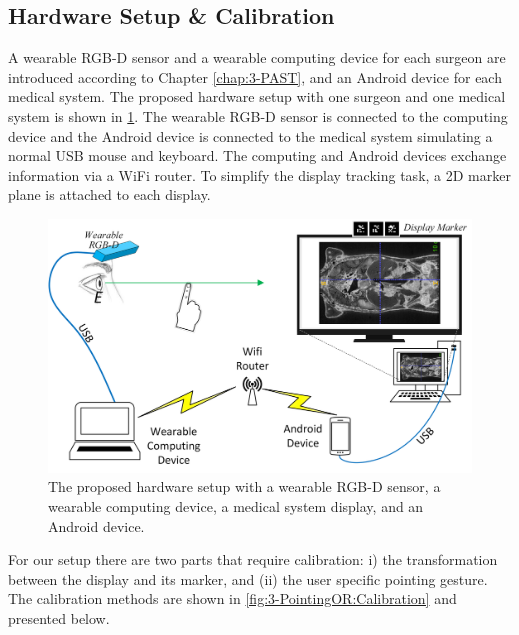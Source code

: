 \subsection{Hardware Setup \& Calibration}
A wearable RGB-D sensor  and a wearable computing device for each surgeon are introduced according to Chapter \ref{chap:3-PAST}, and an Android device for each medical system. The proposed hardware setup with one surgeon and one medical system is shown in  \figurename{\ref{fig:3-PointingOR:Hardware}}.
The wearable RGB-D sensor is connected to the computing device and the Android device is connected to the medical system simulating a normal USB mouse and keyboard. The computing and Android devices exchange information via a WiFi router. To simplify the display tracking task, a 2D marker plane is attached to each display.
\begin{figure}[htb]
	\includegraphics[width=1.0\textwidth]{figures/3-PointingOR/Hardware.png}
	\caption{The proposed hardware setup with a wearable RGB-D sensor, a wearable computing device, a medical system display, and an Android device.}
	\label{fig:3-PointingOR:Hardware}       %
\end{figure}

For our setup there are two parts that require calibration: i) the transformation between the display and its marker, and (ii) the user specific pointing gesture. The calibration methods are shown in \figurename{\ref{fig:3-PointingOR:Calibration}} and presented below.
